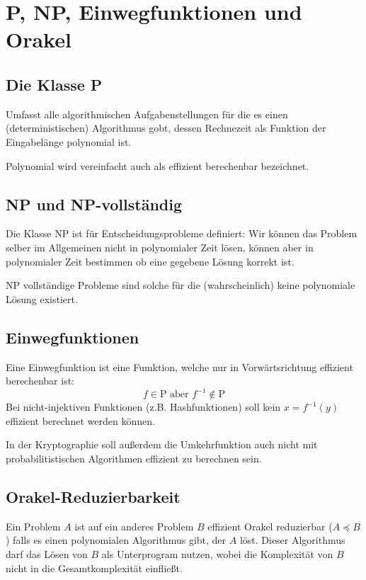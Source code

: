 \chapter{P, NP, Einwegfunktionen und Orakel}
\section{Die Klasse P}
Umfasst alle algorithmischen Aufgabenstellungen für die es einen (deterministischen)
Algorithmus gobt, dessen Rechnezeit als Funktion der Eingabelänge polynomial ist.

Polynomial wird vereinfacht auch als effizient berechenbar bezeichnet.

\section{NP und NP-vollständig}
Die Klasse NP ist für Entscheidungsprobleme definiert: Wir können das
Problem selber im Allgemeinen nicht in polynomialer Zeit lösen, können
aber in polynomialer Zeit bestimmen ob eine gegebene Lösung korrekt ist.

NP vollständige Probleme sind solche für die (wahrscheinlich) keine
polynomiale Lösung existiert.

\section{Einwegfunktionen}
Eine Einwegfunktion ist eine Fumktion, welche nur in Vorwärtsrichtung effizient
berechenbar ist:
\begin{equation}
    f \in \text{P aber } f^{-1} \notin \text{P}
\end{equation}
Bei nicht-injektiven Funktionen (z.B. Hashfunktionen) soll kein $x = f^{-1}(y)$ effizient
berechnet werden können.

In der Kryptographie soll außerdem die Umkehrfunktion auch nicht mit probabilitistischen
Algorithmen effizient zu berechnen sein.

\section{Orakel-Reduzierbarkeit}
Ein Problem $A$ ist auf ein anderes Problem $B$ effizient Orakel reduzierbar 
($A \preceq B$) falls es einen polynomialen Algorithmus gibt, der $A$ löst.
Dieser Algorithmus  darf das Lösen von $B$ als Unterprogram nutzen, wobei
die Komplexität von $B$ nicht in die Gesamtkomplexität einfließt.

